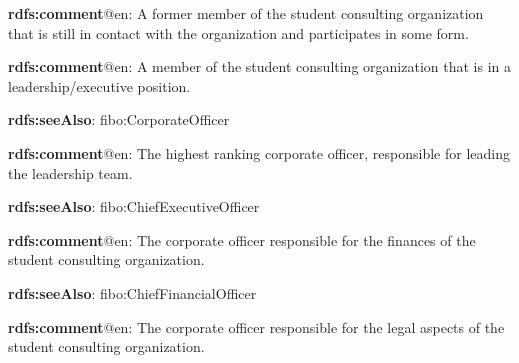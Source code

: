 \documentclass[a4paper, DIV=13, BCOR=0cm]{scrbook}
\begin{document}
\begin{mdframed}[style=onto-2, frametitle={Alumna}]
	{%
		\begin{compactitem}
			\item \textbf{rdfs:comment}@en: A former member of the student consulting organization that is still in contact with the organization and participates in some form.
		\end{compactitem}
	} %
\end{mdframed}

\begin{mdframed}[style=onto-2, frametitle={Corporate Officer}]
	{%
		\begin{compactitem}
			\item \textbf{rdfs:comment}@en: A member of the student consulting organization that is in a leadership/executive position.
			\item \textbf{rdfs:seeAlso}: fibo:CorporateOfficer
		\end{compactitem}
	} %
\end{mdframed}

\begin{mdframed}[style=onto-3, frametitle={Chief Executive Officer}]
	{%
		\begin{compactitem}
			\item \textbf{rdfs:comment}@en: The highest ranking corporate officer, responsible for leading the leadership team.
			\item \textbf{rdfs:seeAlso}: fibo:ChiefExecutiveOfficer
		\end{compactitem}
	} %
\end{mdframed}

\begin{mdframed}[style=onto-3, frametitle={Chief Financial Officer}]
	{%
		\begin{compactitem}
			\item \textbf{rdfs:comment}@en: The corporate officer responsible for the finances of the student consulting organization.
			\item \textbf{rdfs:seeAlso}: fibo:ChiefFinancialOfficer
		\end{compactitem}
	} %
\end{mdframed}

\begin{mdframed}[style=onto-3, frametitle={Chief Legal Officer}]
	{%
		\begin{compactitem}
			\item \textbf{rdfs:comment}@en: The corporate officer responsible for the legal aspects of the student consulting organization.
		\end{compactitem}
	} %
\end{mdframed}
\end{document}
